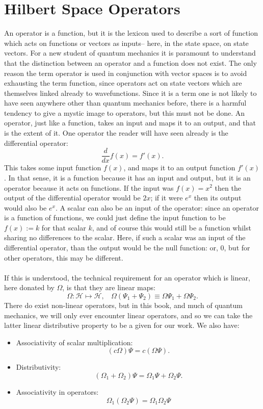 \section{Hilbert Space Operators}
An operator is a function, but it is the lexicon used to describe a sort of function which acts on functions or vectors as inputs-- here, in the state space, on state vectors. For a new student of quantum mechanics it is paramount to understand that the distinction between an operator and a function does not exist. The only reason the term operator is used in conjunction with vector spaces is to avoid exhausting the term function, since operators act on state vectors which are themselves linked already to wavefunctions. Since it is a term one is not likely to have seen anywhere other than quantum mechanics before, there is a harmful tendency to give a mystic image to operators, but this must not be done. An operator, just like a function, takes an input and maps it to an output, and that is the extent of it. One operator the reader will have seen already is the differential operator:
$$
\frac{d}{dx}f(x)=f'(x).
$$
This takes some input function $f(x)$, and maps it to an output function $f'(x)$. In that sense, it is a function because it has an input and output, but it is an operator because it acts on functions. If the input was $f(x)=x^2$ then the output of the differential operator would be $2x$; if it were $e^x$ then its output would also be $e^x$. A scalar can also be an input of the operator: since an operator is a function of functions, we could just define the input function to be $f(x):=k$ for that scalar $k$, and of course this would still be a function whilst sharing no differences to the scalar. Here, if such a scalar was an input of the differential operator, than the output would be the null function: or, 0, but for other operators, this may be different.
\\\\
If this is understood, the technical requirement for an operator which is linear, here donated by $\Omega$, is that they are linear maps:
$$
\Omega: \mathscr{H} \mapsto \mathscr{H},\:\:\:\: \Omega(\Psi_{1}+\Psi_{2})\equiv \Omega\Psi_{1}+\Omega\Psi_{2}.
$$
There do exist non-linear operators, but in this book, and much of quantum mechanics, we will only ever encounter linear operators, and so we can take the latter linear distributive property to be a given for our work. We also have:
\begin{itemize}
    \item Associativity of scalar multiplication:
    $$
    (c\Omega)\Psi=c(\Omega\Psi).
    $$
    \item Distributivity:
    $$
    (\Omega_{1}+\Omega_{2})\Psi=\Omega_{1}\Psi + \Omega_{2}\Psi.
    $$
    \item Associativity in operators:
    $$
    \Omega_{1}(\Omega_{2}\Psi)=\Omega_{1}\Omega_{2}\Psi
    $$
\end{itemize}
